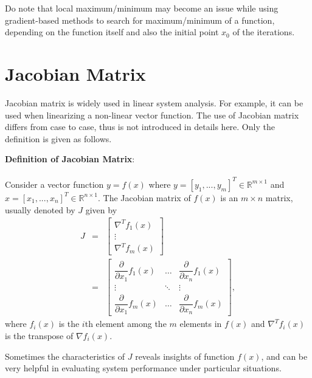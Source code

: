 Do note that local maximum/minimum may become an issue while using gradient-based methods to search for maximum/minimum of a function, depending on the function itself and also the initial point $x_0$ of the iterations.

\section{Jacobian Matrix} \label{ch6sec:jacobianmatrix}

Jacobian matrix is widely used in linear system analysis. For example, it can be used when linearizing a non-linear vector function. The use of Jacobian matrix differs from case to case, thus is not introduced in details here. Only the definition is given as follows.

\begin{VF}
	\textbf{Definition of Jacobian Matrix}:
	\\
	\\
    Consider a vector function $y=f(x)$ where $y = \left[y_1,...,y_m\right]^T \in \mathbb{R}^{m \times 1}$ and $x = [x_1,...,x_n]^T \in \mathbb{R}^{n \times 1}$. The Jacobian matrix of $f(x)$ is an $m \times n$ matrix, usually denoted by $J$ given by
	\begin{eqnarray}
	  J &=& \left[\begin{array}{c}
	                \nabla^T f_1(x) \\
	                \vdots \\
	                \nabla^T f_m(x)
	              \end{array}\right] \nonumber \\
        &=& \left[\begin{array}{ccc}
                    \dfrac{\partial}{\partial x_1}f_1(x) & \ldots & \dfrac{\partial}{\partial x_n}f_1(x) \\
                    \vdots & \ddots & \vdots \\
                    \dfrac{\partial}{\partial x_1}f_m(x) & \ldots & \dfrac{\partial}{\partial x_n}f_m(x)
                  \end{array}\right], \nonumber
	\end{eqnarray}
where $f_i(x)$ is the $i$th element among the $m$ elements in $f(x)$ and $\nabla^T f_i(x)$ is the transpose of $\nabla f_i(x)$.
\end{VF}

Sometimes the characteristics of $J$ reveals insights of function $f(x)$, and can be very helpful in evaluating system performance under particular situations.
